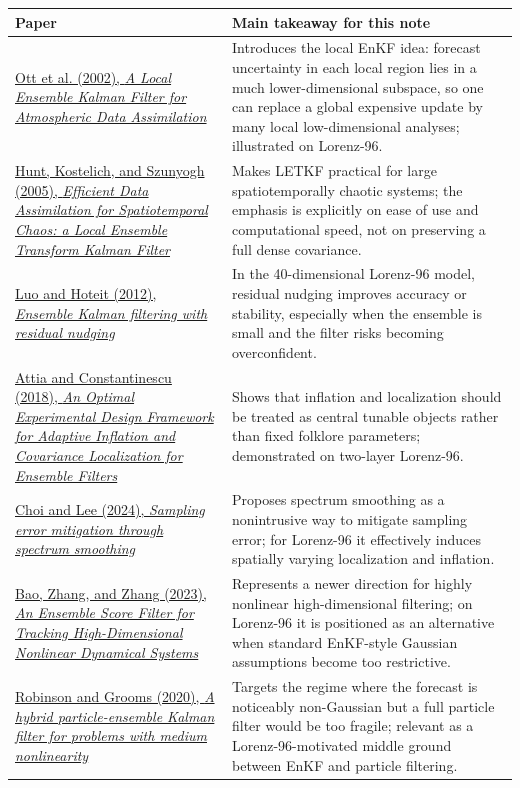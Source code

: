 \documentclass[12pt,a4paper]{article}
\begin{document}
\begin{longtable}{>{\raggedright\arraybackslash}p{4.3cm} >{\raggedright\arraybackslash}p{9.1cm}}
\toprule
Paper & Main takeaway for this note \\
\midrule
\endhead
\href{https://arxiv.org/abs/physics/0203058}{Ott et al. (2002), \emph{A Local Ensemble Kalman Filter for Atmospheric Data Assimilation}} & Introduces the local EnKF idea: forecast uncertainty in each local region lies in a much lower-dimensional subspace, so one can replace a global expensive update by many local low-dimensional analyses; illustrated on Lorenz-96. \\
\href{https://arxiv.org/abs/physics/0511236}{Hunt, Kostelich, and Szunyogh (2005), \emph{Efficient Data Assimilation for Spatiotemporal Chaos: a Local Ensemble Transform Kalman Filter}} & Makes LETKF practical for large spatiotemporally chaotic systems; the emphasis is explicitly on ease of use and computational speed, not on preserving a full dense covariance. \\
\href{https://arxiv.org/abs/1210.1318}{Luo and Hoteit (2012), \emph{Ensemble Kalman filtering with residual nudging}} & In the 40-dimensional Lorenz-96 model, residual nudging improves accuracy or stability, especially when the ensemble is small and the filter risks becoming overconfident. \\
\href{https://arxiv.org/abs/1806.10655}{Attia and Constantinescu (2018), \emph{An Optimal Experimental Design Framework for Adaptive Inflation and Covariance Localization for Ensemble Filters}} & Shows that inflation and localization should be treated as central tunable objects rather than fixed folklore parameters; demonstrated on two-layer Lorenz-96. \\
\href{https://arxiv.org/abs/2404.00154}{Choi and Lee (2024), \emph{Sampling error mitigation through spectrum smoothing}} & Proposes spectrum smoothing as a nonintrusive way to mitigate sampling error; for Lorenz-96 it effectively induces spatially varying localization and inflation. \\
\href{https://arxiv.org/abs/2309.00983}{Bao, Zhang, and Zhang (2023), \emph{An Ensemble Score Filter for Tracking High-Dimensional Nonlinear Dynamical Systems}} & Represents a newer direction for highly nonlinear high-dimensional filtering; on Lorenz-96 it is positioned as an alternative when standard EnKF-style Gaussian assumptions become too restrictive. \\
\href{https://arxiv.org/abs/2006.04699}{Robinson and Grooms (2020), \emph{A hybrid particle-ensemble Kalman filter for problems with medium nonlinearity}} & Targets the regime where the forecast is noticeably non-Gaussian but a full particle filter would be too fragile; relevant as a Lorenz-96-motivated middle ground between EnKF and particle filtering. \\

\end{longtable}
\end{document}
